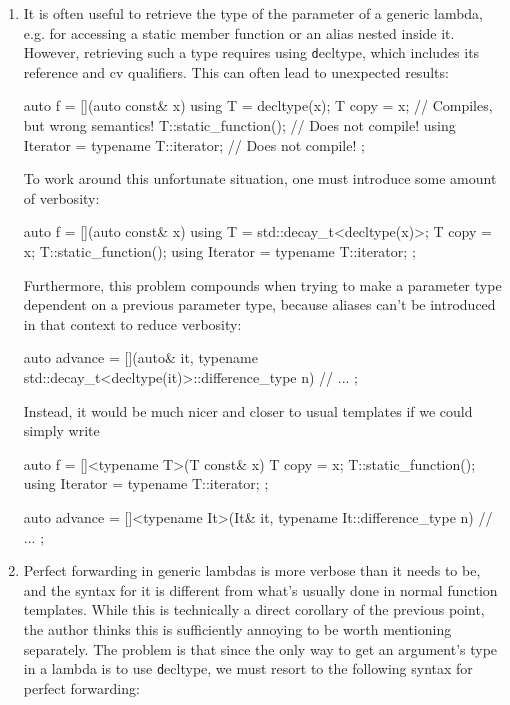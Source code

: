 \documentclass{wg21}
\newcommand{\cc}[1]{\texttt{#1}}
\begin{document}
\begin{enumerate}
\item
It is often useful to retrieve the type of the parameter of a generic
lambda, e.g. for accessing a static member function or an alias nested
inside it. However, retrieving such a type requires using \cc decltype,
which includes its reference and cv qualifiers. This can often lead to
unexpected results:

\begin{cpp}
auto f = [](auto const& x) {
  using T = decltype(x);
  T copy = x;                             // Compiles, but wrong semantics!
  T::static_function();                   // Does not compile!
  using Iterator = typename T::iterator;  // Does not compile!
};
\end{cpp}

To work around this unfortunate situation, one must introduce some
amount of verbosity:

\begin{cpp}
auto f = [](auto const& x) {
  using T = std::decay_t<decltype(x)>;
  T copy = x;
  T::static_function();
  using Iterator = typename T::iterator;
};
\end{cpp}

Furthermore, this problem compounds when trying to make a parameter type
dependent on a previous parameter type, because aliases can't be introduced
in that context to reduce verbosity:

\begin{cpp}
auto advance = [](auto& it,
                  typename std::decay_t<decltype(it)>::difference_type n) {
  // ...
};
\end{cpp}

Instead, it would be much nicer and closer to usual templates if we could
simply write

\begin{cpp}
auto f = []<typename T>(T const& x) {
  T copy = x;
  T::static_function();
  using Iterator = typename T::iterator;
};

auto advance = []<typename It>(It& it, typename It::difference_type n) {
  // ...
};
\end{cpp}


\item
Perfect forwarding in generic lambdas is more verbose than it needs to
be, and the syntax for it is different from what's usually done in normal
function templates. While this is technically a direct corollary of the
previous point, the author thinks this is sufficiently annoying to be
worth mentioning separately. The problem is that since the only way to
get an argument's type in a lambda is to use \cc decltype, we must resort
to the following syntax for perfect forwarding:


\end{enumerate}
\end{document}
